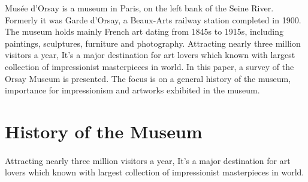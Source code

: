 \documentclass[
10pt, %
a4paper, %
oneside, %
headinclude,footinclude, %
BCOR5mm, %
]{scrartcl}
\theoremstyle{definition} %
\theoremstyle{plain} %
\theoremstyle{remark} %
\begin{document}
%
 
Musée d'Orsay is a museum in Paris, on the left bank of the Seine River. Formerly it was Garde d'Orsay, a Beaux-Arts railway station completed in 1900. The museum holds mainly French art dating from 1845s to 1915s, including paintings, sculptures, furniture and photography. Attracting nearly three million visitors a year, It's a major destination for art lovers which known with largest collection of impressionist masterpieces in world. In this paper, a survey of the Orsay Museum is presented. The focus is on a general history of the museum, importance for impressionism and artworks exhibited in the museum.



\let\thefootnote\relax{}




\newpage %

\pagestyle{scrheadings}


\section{History of the Museum}

\paragraph{} Attracting nearly three million visitors a year, It's a major destination for art lovers which known with largest collection of impressionist masterpieces in world.
\end{document}
